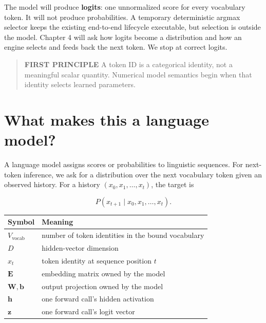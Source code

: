The model will produce \textbf{logits}: one unnormalized score for every
vocabulary token. It will not produce probabilities. A temporary
deterministic argmax selector keeps the existing end-to-end lifecycle
executable, but selection is outside the model. Chapter 4 will ask how
logits become a distribution and how an engine selects and feeds back
the next token. We stop at correct logits.

\begin{quote}
\textbf{FIRST PRINCIPLE} A token ID is a categorical identity, not a
meaningful scalar quantity. Numerical model semantics begin when that
identity selects learned parameters.
\end{quote}

\section{What makes this a language
model?}\label{what-makes-this-a-language-model}

A language model assigns scores or probabilities to linguistic
sequences. For next-token inference, we ask for a distribution over the
next vocabulary token given an observed history. For a history
\((x_0,x_1,\ldots,x_t)\), the target is

\begin{equation}
P\!\left(x_{t+1}\mid x_0,x_1,\ldots,x_t\right).
\end{equation}

{\def\LTcaptype{none} %
\begin{longtable}[]{@{}
  >{\raggedright\arraybackslash}p{}
  >{\raggedright\arraybackslash}p{}@{}}
\toprule\noalign{}
\begin{minipage}[b]{\linewidth}\raggedright
Symbol
\end{minipage} & \begin{minipage}[b]{\linewidth}\raggedright
Meaning
\end{minipage} \\
\midrule\noalign{}
\endhead
\bottomrule\noalign{}
\endlastfoot
\(V_{\mathrm{vocab}}\) & number of token identities in the bound
vocabulary \\
\(D\) & hidden-vector dimension \\
\(x_t\) & token identity at sequence position \(t\) \\
\(\mathbf{E}\) & embedding matrix owned by the model \\
\(\mathbf{W},\mathbf{b}\) & output projection owned by the model \\
\(\mathbf{h}\) & one forward call's hidden activation \\
\(\mathbf{z}\) & one forward call's logit vector \\
\end{longtable}
}

